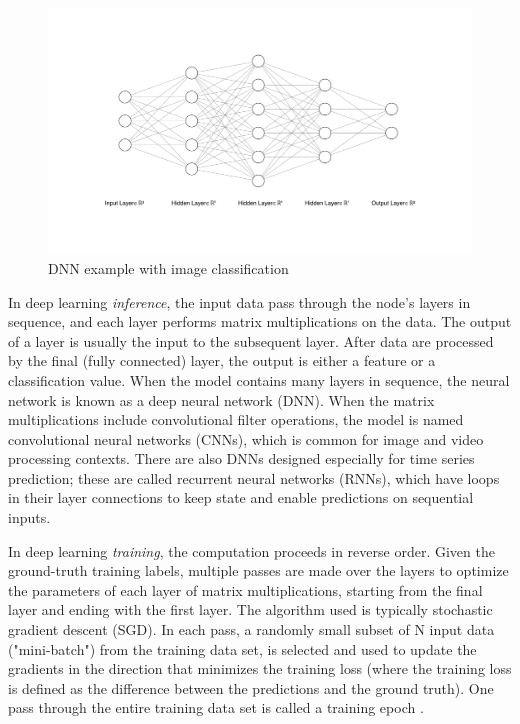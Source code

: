 \begin{figure}
	\includegraphics[width=\linewidth]{images/nn.png}
	\caption[DNN example]{DNN example with image classification}
	\label{fig:dnn}
\end{figure}

In deep learning \textit{inference}, the input data pass through the node's layers in sequence, and each layer performs matrix multiplications on the data. The output of a layer is usually the input to the subsequent layer. After data are processed by the final (fully connected) layer, the output is either a feature or a classification value. When the model contains many layers in sequence, the neural network is known as a deep neural network (DNN). When the matrix multiplications include convolutional filter operations, the model is named convolutional neural networks (CNNs), which is common for image and video processing contexts. There are also DNNs designed especially for time series prediction; these are called recurrent neural networks (RNNs), which have loops in their layer connections to keep state and enable predictions on sequential inputs.

In deep learning \textit{training}, the computation proceeds in reverse order. Given the ground-truth training labels, multiple passes are made over the layers to optimize the parameters of each layer of matrix multiplications, starting from the final layer and ending with the first layer. The algorithm used is typically stochastic gradient descent (SGD).  In each pass, a randomly small subset of N input data ("mini-batch") from the training data set, is selected and used to update the gradients in the direction that minimizes the training loss (where the training loss is defined as the difference between the predictions and the ground truth). One pass through the entire training data set is called a training epoch \cite{ruder2016overview}.

